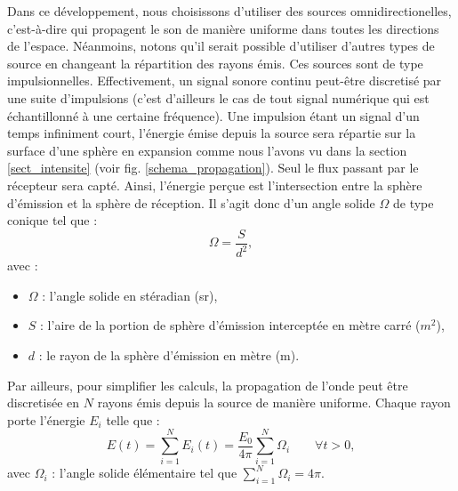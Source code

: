 Dans ce développement, nous choisissons d'utiliser des sources omnidirectionelles, c'est-à-dire qui propagent le son de manière uniforme dans toutes les directions de l'espace. Néanmoins, notons qu'il serait possible d'utiliser d'autres types de source en changeant la répartition des rayons émis. Ces sources sont de type impulsionnelles. Effectivement, un signal sonore continu peut-être discretisé par une suite d'impulsions (c'est d'ailleurs le cas de tout signal numérique qui est échantillonné à une certaine fréquence). Une impulsion étant un signal d'un temps infiniment court, l'énergie émise depuis la source sera répartie sur la surface d'une sphère en expansion comme nous l'avons vu dans la section \ref{sect_intensite} (voir fig. \ref{schema_propagation}). Seul le flux passant par le récepteur sera capté. Ainsi, l'énergie perçue est l'intersection entre la sphère d'émission et la sphère de réception. Il s'agit donc d'un angle solide $\Omega$ de type conique tel que :
%
\begin{equation}
\Omega =\frac{S}{d^2},
\end{equation}
avec  :
\begin{itemize}
\item $\Omega$ : l'angle solide en stéradian (sr),
\item $S$ : l'aire de la portion de sphère d'émission interceptée en mètre carré ($m^2$),
\item $d$ : le rayon de la sphère d'émission en mètre (m).
\end{itemize}
%
Par ailleurs, pour simplifier les calculs, la propagation de l'onde peut être discretisée en $N$ rayons émis depuis la source de manière uniforme. Chaque rayon porte l'énergie $E_i$ telle que :
%
\begin{equation}
E(t) = \sum_{i=1}^N E_i(t) = \frac{E_0}{4\pi}  \sum_{i=1}^N \Omega_i  \qquad \forall t > 0,
\end{equation}
avec  $\Omega_i$ : l'angle solide élémentaire tel que $ \sum_{i=1}^N \Omega_i = 4\pi$. \\


